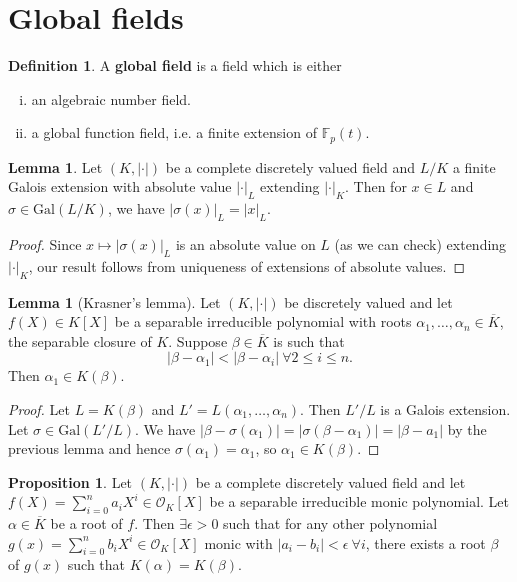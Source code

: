 \documentclass{article}
\theoremstyle{definition}
\newtheorem{lemma}[theorem]{Lemma}
\newtheorem{prop}[theorem]{Proposition}
\newtheorem{defn}{Definition}[section]
\begin{document}
\section{Global fields}
\begin{defn}
    A \textbf{global field} is a field which is either 
    \begin{enumerate}[(i)]
        \item an algebraic number field.
        \item a global function field, i.e. a finite extension of $\mathbb{F}_p(t)$.
    \end{enumerate}
\end{defn}
\begin{lemma}\label{lemma8.1}
    Let $(K,|\cdot|)$ be a complete discretely valued field and $L/K$ a finite Galois extension with absolute value $|\cdot|_L$ extending $|\cdot|_K$. Then for $x \in L$ and $\sigma \in \text{Gal}(L/K)$, we have $|\sigma(x)|_L = |x|_L$.
\end{lemma}
\begin{proof}
    Since $x \mapsto |\sigma(x)|_L$ is an absolute value on $L$ (as we can check) extending $|\cdot|_K$, our result follows from uniqueness of extensions of absolute values.
\end{proof}
\begin{lemma}[Krasner's lemma]
    Let $(K,|\cdot|)$ be discretely valued and let $f(X) \in K[X]$ be a separable irreducible polynomial with roots $\alpha_1,\ldots,\alpha_n \in \overline{K}$, the separable closure of $K$. Suppose $\beta \in \overline{K}$ is such that \[
    |\beta-\alpha_1|< |\beta-\alpha_i| ~\forall 2\le i\le n.
    \]
    Then $\alpha_1 \in K(\beta)$.
\end{lemma}
\begin{proof}
    Let $L = K(\beta)$ and $L' = L(\alpha_1,\ldots,\alpha_n)$. Then $L'/L$ is a Galois extension. Let $\sigma \in \text{Gal}(L'/L)$. We have $|\beta - \sigma(\alpha_1)| = |\sigma(\beta-\alpha_1)| = |\beta-a_1|$ by the previous lemma and hence $\sigma(\alpha_1)=\alpha_1$, so $\alpha_1 \in K(\beta)$.
\end{proof}
\begin{prop}\label{prop8.3}
    Let $(K,|\cdot|)$ be a complete discretely valued field and let $f(X) = \sum_{i=0}^{n} a_iX^i \in \mathcal{O}_K[X]$ be a separable irreducible monic polynomial. Let $\alpha \in \overline{K}$ be a root of $f$. Then $\exists \epsilon>0$ such that for any other polynomial $g(x) = \sum_{i=0}^{n} b_iX^i \in \mathcal{O}_K[X]$ monic with $|a_i-b_i|<\epsilon ~\forall i$, there exists a root $\beta$ of $g(x)$ such that $K(\alpha)=K(\beta)$.
\end{prop}
\end{document}
